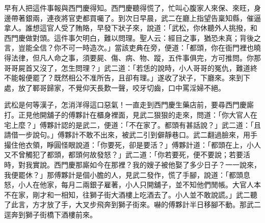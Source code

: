 \begin{showcontents}{}
早有人把這件事報與西門慶得知。西門慶聽得慌了，忙叫心腹家人來保、來旺，身邊帶著銀兩，連夜將官吏都買囑了。到次日早晨，武二在廳上指望告稟知縣，催逼拿人。誰想這官人受了賄賂，早發下狀子來，說道：「武松，你休聽外人挑撥，和西門慶做對頭。這件事欠明白，難以問理。聖人云：經目之事，猶恐未真；背後之言，豈能全信？你不可一時造次。」當該吏典在旁，便道：「都頭，你在衙門裡也曉得法律，但凡人命之事，須要屍、傷、病、物、蹤，五件事俱完，方可推問。你那哥哥屍首又沒了，怎生問理？」武二道：「若恁的說時，小人哥哥的冤仇，難道終不能報便罷了？既然相公不准所告，且卻有理。」遂收了狀子，下廳來。來到下處，放了鄆哥歸家，不覺仰天長歎一聲，咬牙切齒，口中罵淫婦不絕。

武松是何等漢子，怎消洋得這口惡氣！一直走到西門慶生藥店前，要尋西門慶廝打。正見他開舖子的傅夥計在櫃身裡面，見武二狠狠的走來，問道：「你大官人在宅上麼？」傅夥計認的是武二，便道：「不在家了。都頭有甚話說？」武二道：「且請借一步說句。」傅夥計不敢不出來，被武二引到僻靜巷口。武二翻過臉來，用手撮住他衣領，睜圓怪眼說道：「你要死，卻是要活？」傅夥計道：「都頭在上，小人又不曾觸犯了都頭，都頭何故發怒？」武二道：「你若要死，便不要說；若要活時，對我實說。西門慶那廝如今在那裡？我的嫂子被他娶了多少日子？一一說來，我便罷休？」那傅夥計是個小膽的人，見武二發作，慌了手腳，說道：「都頭息怒，小人在他家，每月二兩銀子雇著，小人只開舖子，並不知他們閒帳。大官人本不在家，剛才和一相知，往獅子街大酒樓上吃酒去了。小人並不敢說謊。」武二聽了此言，方才放了手，大叉步飛奔到獅子街來。嚇的傅夥計半日移腳不動。那武二逕奔到獅子街橋下酒樓前來。


\end{showcontents}
